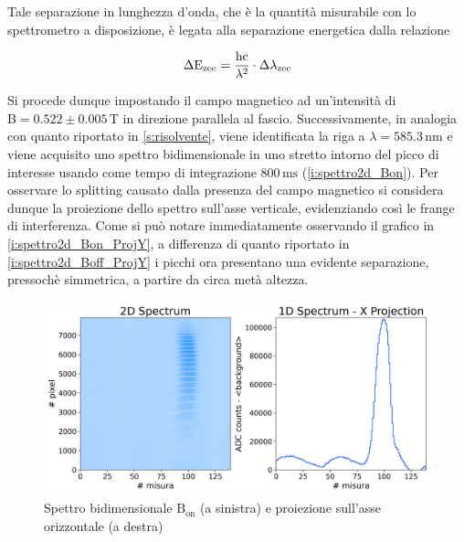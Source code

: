 \documentclass[twocolumn,10pt]{asme2ej}
\begin{document}
\noindent Tale separazione in lunghezza d'onda, che è la quantità misurabile con lo spettrometro a disposizione, è legata alla
separazione energetica dalla relazione

\vspace{-15pt}
\begin{equation}
    \Delta \text{E}_{\text{zee}} = \frac{\text{hc}}{\lambda^2} \cdot \Delta\lambda_{\text{zee}}
    \label{e:dEzee}
\vspace{-5pt}
\end{equation}

Si procede dunque impostando il campo magnetico ad un'intensità di $\text{B} = 0.522 \pm 0.005 \,\si{\tesla}$ in
direzione parallela al fascio. Successivamente, in analogia con quanto riportato in \autoref{s:risolvente}, viene
identificata la riga a $\lambda = 585.3 \,\si{\nano\metre}$ e viene acquisito uno spettro bidimensionale in uno stretto
intorno del picco di interesse usando come tempo di integrazione $800\,\si{\milli\second}$ (\autoref{i:spettro2d_Bon}).
Per osservare lo splitting causato dalla presenza del campo magnetico si considera dunque la proiezione dello spettro
sull'asse verticale, evidenziando così le frange di interferenza. Come si può notare immediatamente osservando il
grafico in \autoref{i:spettro2d_Bon_ProjY}, a differenza di quanto riportato in \autoref{i:spettro2d_Boff_ProjY} i
picchi ora presentano una evidente separazione, pressochè simmetrica, a partire da circa metà altezza. 

\begin{figure}
    \centering
    \includegraphics[width=\linewidth]{../Plots/Bon_2d_spectrum.png}
    \caption{Spettro bidimensionale $\text{B}_{\text{on}}$ (a sinistra) e proiezione sull'asse orizzontale (a destra)}
    \label{i:spettro2d_Bon}
    \vspace{-10pt}
\end{figure}
\end{document}
